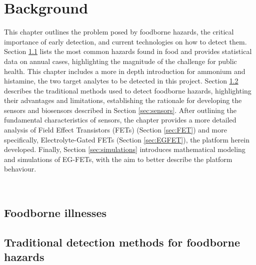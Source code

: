 \chapter{Background}
\label{cap:chapter1}

This chapter outlines the problem posed by foodborne hazards, the critical
importance of early detection, and current technologies on how to detect them.
Section \ref{sec:foodborne_hazards} lists the most common hazards found in food
and provides statistical data on annual cases, highlighting the magnitude of the
challenge for public health. This chapter includes a more in depth introduction
for ammonium and histamine, the two target analytes to be detected in this
project. Section \ref{sec:traditional_detection} describes the traditional
methods used to detect foodborne hazards, highlighting their advantages and
limitations, establishing the rationale for developing the sensors and
biosensors described in Section \ref{sec:sensors}. After outlining the
fundamental characteristics of sensors, the chapter provides a more detailed
analysis of Field Effect Transistors (FETs) (Section \ref{sec:FET}) and more
specifically, Electrolyte-Gated FETs (Section \ref{sec:EGFET}), \ie{} the
platform herein developed. Finally, Section \ref{sec:simulations} introduces
mathematical modeling and simulations of EG-FETs, with the aim to better
describe the platform behaviour.

\newpage
\thispagestyle{empty}
\ %
\newpage


\section{Foodborne illnesses}
\label{sec:foodborne_hazards}

%


\section{Traditional detection methods for foodborne hazards}
\label{sec:traditional_detection}

%
 

